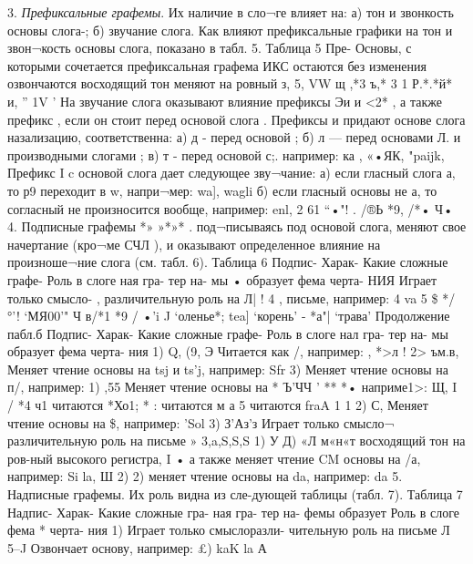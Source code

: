 3. \emph{Префиксальные графемы}. Их наличие в сло¬ге влияет на: а) тон и звонкость основы слога-; б) звучание слога. Как влияют префиксальные графики на тон и звон¬кость основы слога, показано в табл. 5.
Таблица 5
Пре- Основы, с которыми сочетается префиксальная графема
 ИКС остаются без изменения	озвончаются восходящий тон
меняют на ровный
з, 5, 	VW	щ
	 ,*3	ъ,* 	
 	3	1
	Р.*.*й*		
и,	'' 1V '
На звучание слога оказывают влияние префиксы Эи и <2* , а также префикс   , если он стоит перед основой
слога .
Префиксы и придают основе слога назализацию, соответственна: а) д - перед основой ; б) л — перед основами   Л.  и производными слогами	;
в) т - перед основой с;. например:	 ка ,
«•ЯК, "paijk,
Префикс I c основой слога дает следующее зву¬чание: а) если гласный слога а, то р9 переходит в w, напри¬мер:	wa],	wagli б) если гласный основы
не а, то согласный не произносится вообще, например:
enl, 2 61 “•"! .	/®Ь  *9, /*• Ч•
4.	Подписные графемы *» »*»* . под¬писываясь под основой слога, меняют свое начертание (кро¬ме СЧЛ ), и оказывают определенное влияние на произноше¬ние слога (см. табл. 6).
Таблица 6
Подпис- Харак- Какие сложные графе- Роль в слоге ная гра- тер на-	мы • образует
фема черта-
	НИЯ	
Играет только смысло- , различительную роль на Л|	!	4	,	письме, например:  
 	4 va   5 \$	*/°'! ‘МЯ00'" Ч в/*1
*9	/ •'i J	‘оленье*;   tea] ‘корень’
-   *а"| ‘трава’
			 Продолжение пабл.б
Подпис- Харак- Какие сложные графе-	Роль в слоге
нал гра- тер на- мы образует фема черта-
	ния			
1)	Q, (9, Э	Читается как /, например:
,	*>л
!	2>	ъм.в,	Меняет чтение основы	на
tsj и ts’j, например: Sfr
3)		Меняет чтение основы на
п/, например:
1)	  ,55 Меняет чтение основы на
*	Ъ'ЧЧ ' ** *• наприме1>:	Щ,
I / *4	ч1 читаются *Хо1;
*	:	читаются
м	а   5 читаются
	fraA 1	1	
2)	С,	Меняет чтение основы	на
\$, например:   'Sol
3)	З’Аз’з	Играет только смысло¬
различительную роль на письме
»	3,a,S,S,S	1) У Д) «Л м«н«т
восходящий тон на ров-ный высокого регистра,
I
•	а также меняет чтение
CM	основы на /а, например:
Si la, Ш
2)	 	2) меняет чтение основы
на da, например:   da
5.	Надписные графемы. Их роль видна из сле-дующей таблицы (табл. 7).
Таблица 7
Надпис- Харак- Какие сложные гра-
ная гра- тер на- фемы образует	Роль в слоге
фема * черта-
	ния	
1)	Играет только смыслоразли-
чительную роль на письме
Л	
 	5--J	Озвончает основу, например:
£) kaK   la А
